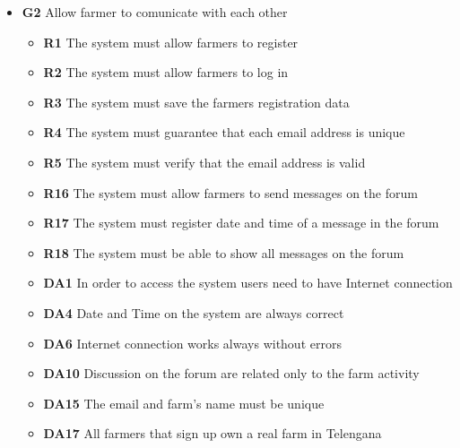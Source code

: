 \begin{itemize}
\item \textbf{G2} Allow farmer to comunicate with each other
    \begin{itemize}
        \renewcommand\labelitemi{--}
        \item \textbf{R1} The system must allow farmers to register
        \item \textbf{R2} The system must allow farmers to log in
        \item \textbf{R3} The system must save the farmers registration data
        \item \textbf{R4} The system must guarantee that each email address is unique
        \item \textbf{R5} The system must verify that the email address is valid
        \item \textbf{R16} The system must allow farmers to send messages on the forum
        \item \textbf{R17} The system must register date and time of a message in the forum
        \item \textbf{R18} The system must be able to show all messages on the forum
        \item \textbf{DA1} In order to access the system users need to have Internet connection
        \item \textbf{DA4} Date and Time on the system are always correct
        \item \textbf{DA6} Internet connection works always without errors
        \item \textbf{DA10} Discussion on the forum are related only to the farm activity
        \item \textbf{DA15} The email and farm's name must be unique
        \item \textbf{DA17} All farmers that sign up own a real farm in Telengana
    \end{itemize}    


\end{itemize}
